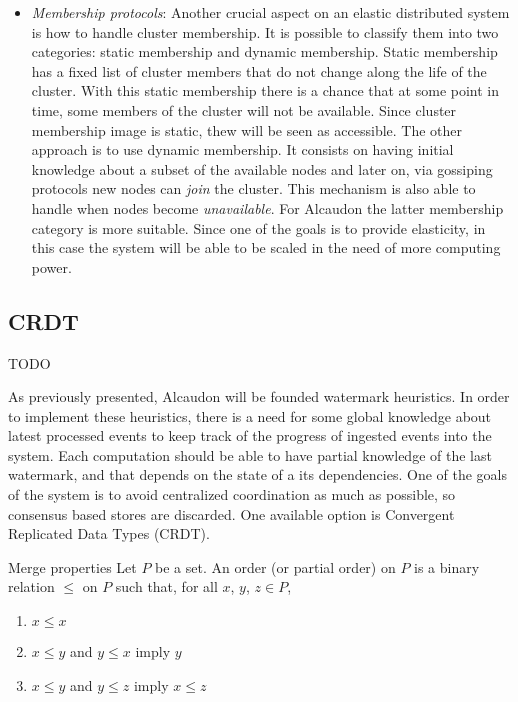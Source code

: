 \begin{itemize}
\item \textit{Membership protocols}: Another crucial aspect on an elastic
  distributed system is how to handle cluster membership. It is possible to
  classify them into two categories: static membership and dynamic membership.
  Static membership has a fixed list of cluster members that do not change along
  the life of the cluster. With this static membership there is a chance that at
  some point in time, some members of the cluster will not be available. Since
  cluster membership image is static, thew will be seen as accessible. The other
  approach is to use dynamic membership. It consists on having initial knowledge
  about a subset of the available nodes and later on, via gossiping
  protocols\cite{gossip} new nodes can \textit{join} the cluster. This mechanism
  is also able to handle when nodes become \textit{unavailable}. For Alcaudon
  the latter membership category is more suitable. Since one of the goals is to
  provide elasticity, in this case the system will be able to be scaled in the
  need of more computing power.
\end{itemize}

\subsection{CRDT}

TODO

As previously presented, Alcaudon will be founded watermark heuristics. In order
to implement these heuristics, there is a need for some global knowledge about
latest processed events to keep track of the progress of ingested events into
the system. Each computation should be able to have partial knowledge of the
last watermark, and that depends on the state of a its dependencies. One of the
goals of the system is to avoid centralized coordination as much as possible, so
consensus based stores are discarded. One available option is Convergent
Replicated Data Types (CRDT)\cite{crdt}.


\begin{definition}{Merge properties}
  Let $P$ be a set. An order (or partial order) on $P$ is a binary relation
  $\leq$ on $P$ such that, for all $x$, $y$, $z \in P$,
  \begin{enumerate}
  \item $x \leq x$
  \item $x \leq y$ and $y \leq x$ imply $y$
  \item $x \leq y$ and $y \leq z$ imply $x \leq z$
  \end{enumerate}
\end{definition}

